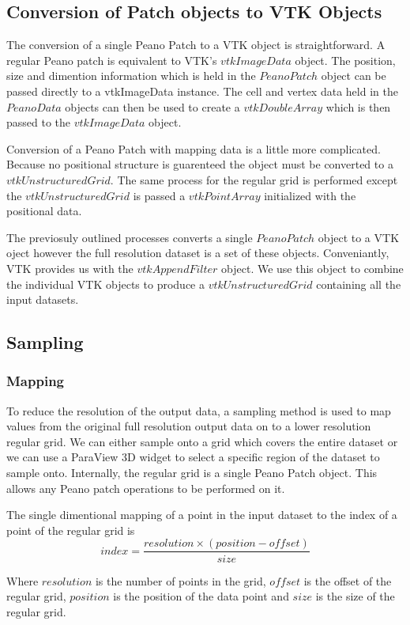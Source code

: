 \documentclass[12pt,a4paper]{article}
\begin{document}
\subsection{Conversion of Patch objects to VTK Objects}
The conversion of a single Peano Patch to a VTK object is straightforward. A regular Peano patch is equivalent to VTK's $vtkImageData$ object. The position, size and dimention information which is held in the $PeanoPatch$ object can be passed directly to a vtkImageData instance. The cell and vertex data held in the $PeanoData$ objects can then be used to create a $vtkDoubleArray$ which is then passed to the $vtkImageData$ object.

Conversion of a Peano Patch with mapping data is a little more complicated. Because no positional structure is guarenteed the object must be converted to a $vtkUnstructuredGrid$. The same process for the regular grid is performed except the $vtkUnstructuredGrid$ is passed a $vtkPointArray$ initialized with the positional data.

The previosuly outlined processes converts a single $PeanoPatch$ object to a VTK oject however the full resolution dataset is a set of these objects. Conveniantly, VTK provides us with the $vtkAppendFilter$ object. We use this object to combine the individual VTK objects to produce a $vtkUnstructuredGrid$ containing all the input datasets.

\subsection{Sampling}

\subsubsection{Mapping}
To reduce the resolution of the output data, a sampling method is used to map values from the original full resolution output data on to a lower resolution regular grid. We can either sample onto a grid which covers the entire dataset or we can use a ParaView 3D widget to select a specific region of the dataset to sample onto.
Internally, the regular grid is a single Peano Patch object. This allows any Peano patch operations to be performed on it.

The single dimentional mapping of a point in the input dataset to the index of a point of the regular grid is
\[
	index = \frac{resolution\times(position - offset)}{size}
\]

Where $resolution$ is the number of points in the grid, $offset$ is the offset of the regular grid, $position$ is the position of the data point and $size$ is the size of the regular grid.
\end{document}
